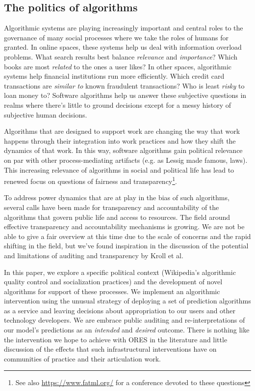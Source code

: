 \subsection{The politics of algorithms}
Algorithmic systems are playing increasingly important and central roles to the governance of many social processes where we take the roles of humans for granted\cite{gillespie2014relevance}.  In online spaces, these systems help us deal with information overload problems.  What search results best balance \emph{relevance} and \emph{importance}?  Which books are most \emph{related} to the ones a user likes?  In other spaces, algorithmic systems help financial institutions run more efficiently.  Which credit card transactions are \emph{similar to} known fraudulent transactions?  Who is least \emph{risky} to loan money to?  Software algorithms help us answer these subjective questions in realms where there's little to ground decisions except for a messy history of subjective human decisions\cite{tufekci2015algorithms}.

Algorithms that are designed to support work are changing the way that work happens through their integration into work practices and how they shift the dynamics of that work\cite{crawford2016algorithm}\cite{gillespie2014relevance}.  In this way, software algorithms gain political relevance on par with other process-mediating artifacts (e.g. as Lessig made famous, laws\cite{lessig1999code}).  This increasing relevance of algorithms in social and political life has lead to renewed focus on questions of fairness and transparency\footnote{See also \url{https://www.fatml.org/} for a conference devoted to these questions}.

To address power dynamics that are at play in the bias of such algorithms, several calls have been made for transparency and accountability of the algorithms that govern public life and access to resources\cite{diakopoulos2015algorithmic}\cite{sandvig2014auditing}\cite{kroll2016accountable}.  The field around effective transparency and accountability mechanisms is growing.  We are not be able to give a fair overview at this time due to the scale of concerns and the rapid shifting in the field, but we've found inspiration in the discussion of the potential and limitations of auditing and transparency by Kroll et al.\cite{kroll2016accountable}

In this paper, we explore a specific political context (Wikipedia's algorithmic quality control and socialization practices) and the development of novel algorithms for support of these processes.  We implement an algorithmic intervention using the unusual strategy of deploying a set of prediction algorithms as a service and leaving decisions about appropriation to our users and other technology developers.  We are embrace public auditing and re-interpretations of our model's predictions as an \emph{intended} and \emph{desired} outcome.  There is nothing like the intervention we hope to achieve with ORES in the literature and little discussion of the effects that such infrastructural interventions have on communities of practice and their articulation work.

